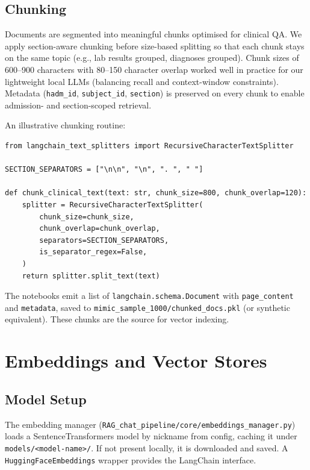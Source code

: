\subsection{Chunking}
Documents are segmented into meaningful chunks optimised for clinical QA. We apply section-aware chunking before size-based splitting so that each chunk stays on the same topic (e.g., lab results grouped, diagnoses grouped). Chunk sizes of 600--900 characters with 80--150 character overlap worked well in practice for our lightweight local LLMs (balancing recall and context-window constraints). Metadata (\texttt{hadm\_id}, \texttt{subject\_id}, \texttt{section}) is preserved on every chunk to enable admission- and section-scoped retrieval.

\smallskip
\noindent An illustrative chunking routine:
\begin{verbatim}
from langchain_text_splitters import RecursiveCharacterTextSplitter

SECTION_SEPARATORS = ["\n\n", "\n", ". ", " "]

def chunk_clinical_text(text: str, chunk_size=800, chunk_overlap=120):
    splitter = RecursiveCharacterTextSplitter(
        chunk_size=chunk_size,
        chunk_overlap=chunk_overlap,
        separators=SECTION_SEPARATORS,
        is_separator_regex=False,
    )
    return splitter.split_text(text)
\end{verbatim}

\noindent The notebooks emit a list of \texttt{langchain.schema.Document} with \texttt{page\_content} and \texttt{metadata}, saved to \texttt{mimic\_sample\_1000/chunked\_docs.pkl} (or synthetic equivalent). These chunks are the source for vector indexing.

\section{Embeddings and Vector Stores}

\subsection{Model Setup}
The embedding manager (\texttt{RAG\_chat\_pipeline/core/embeddings\_manager.py}) loads a SentenceTransformers model by nickname from config, caching it under \texttt{models/<model-name>/}. If not present locally, it is downloaded and saved. A \texttt{HuggingFaceEmbeddings} wrapper provides the LangChain interface.

